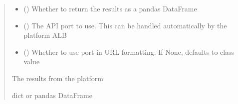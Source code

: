 \documentclass[letterpaper,10pt,english]{sphinxmanual}
\begin{document}
\begin{fulllineitems}
\begin{fulllineitems}
\begin{quote}
\begin{description}
\begin{itemize}
\item {} 
\sphinxAtStartPar
{} (\sphinxstyleliteralemphasis{\sphinxupquote{ (}}\sphinxstyleliteralemphasis{\sphinxupquote{)}}) \textendash{} Whether to return the results as a pandas DataFrame

\item {} 
\sphinxAtStartPar
{} (\sphinxstyleliteralemphasis{\sphinxupquote{ (}}\sphinxstyleliteralemphasis{\sphinxupquote{)}}) \textendash{} The API port to use. This can be handled automatically by the platform ALB

\item {} 
\sphinxAtStartPar
{} (\sphinxstyleliteralemphasis{\sphinxupquote{ (}}\sphinxstyleliteralemphasis{\sphinxupquote{)}}) \textendash{} Whether to use port in URL formatting. If None, defaults to class value

\end{itemize}

\sphinxAtStartPar
{} \textendash{} The results from the platform

\sphinxAtStartPar
dict or pandas DataFrame

\end{description}\end{quote}

\end{fulllineitems}



\end{fulllineitems}
\end{document}
